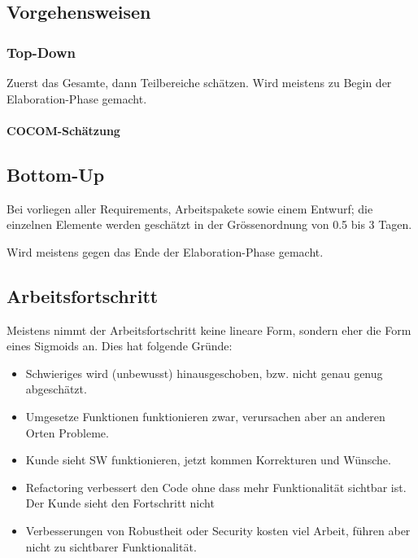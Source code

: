 \subsection{Vorgehensweisen}

\subsubsection{Top-Down}

Zuerst das Gesamte, dann Teilbereiche schätzen. Wird meistens zu Begin der Elaboration-Phase gemacht.

\paragraph{COCOM-Schätzung}


\subsection{Bottom-Up}

Bei vorliegen aller Requirements, Arbeitspakete sowie einem Entwurf; die einzelnen Elemente werden geschätzt in der Grössenordnung von 0.5 bis 3 Tagen.

Wird meistens gegen das Ende der Elaboration-Phase gemacht.


\subsection{Arbeitsfortschritt}

Meistens nimmt der Arbeitsfortschritt keine lineare Form, sondern eher die Form eines Sigmoids an. Dies hat folgende Gründe:
\begin{itemize}
	\item Schwieriges wird (unbewusst) hinausgeschoben, bzw. nicht genau genug abgeschätzt. 
	\item Umgesetze Funktionen funktionieren zwar, verursachen aber an anderen Orten Probleme. 
	\item Kunde sieht SW funktionieren, jetzt kommen Korrekturen und Wünsche. 
	\item Refactoring verbessert den Code ohne dass mehr Funktionalität sichtbar ist. Der Kunde sieht den Fortschritt nicht
	\item Verbesserungen von Robustheit oder Security kosten viel Arbeit, führen aber nicht zu sichtbarer Funktionalität.
\end{itemize}

